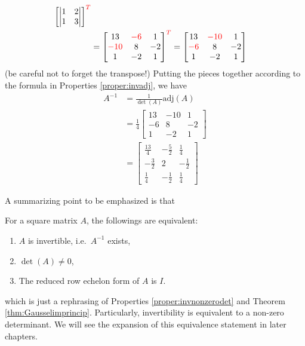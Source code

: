 \begin{solution}
\begin{align*}
\begin{bmatrix}
\begin{vmatrix}
1 & 2 \\
1 & 3 
\end{vmatrix} 
\end{bmatrix}^{\color{red}{T}} \\
&= 
\begin{bmatrix}
13 & \textcolor{red}{-6} & 1 \\
\textcolor{red}{-10} & 8 & -2 \\
1 & -2 & 1
\end{bmatrix}^{\color{red}{T}} = 
\begin{bmatrix}
13 & \textcolor{red}{-10} & 1 \\
\textcolor{red}{-6} & 8 & -2 \\
1 & -2 & 1
\end{bmatrix}
\end{align*}
(be careful not to forget the transpose!) Putting the pieces together according to the formula in Properties \ref{proper:invadj}, we have
\begin{align*}
A^{-1} &= \frac{1}{\det(A)}\text{adj}(A) \\
&= \frac{1}{4}
\begin{bmatrix}
13 & -10 & 1 \\
-6 & 8 & -2 \\
1 & -2 & 1
\end{bmatrix} \\
&= 
\begin{bmatrix}
\frac{13}{4} & -\frac{5}{2} & \frac{1}{4} \\
-\frac{3}{2} & 2 & -\frac{1}{2} \\
\frac{1}{4} & -\frac{1}{2} & \frac{1}{4}
\end{bmatrix}
\end{align*}
\end{solution}
A summarizing point to be emphasized is that
\begin{thm}
\label{thm:equiv1}
For a square matrix $A$, the followings are equivalent:
\begin{enumerate}[label=(\alph*)]
\item $A$ is invertible, i.e.\ $A^{-1}$ exists,
\item $\det(A) \neq 0$,
\item The reduced row echelon form of $A$ is $I$.
\end{enumerate}
\end{thm}
which is just a rephrasing of Properties \ref{proper:invnonzerodet} and Theorem \ref{thm:Gausselimprincip}. 
Particularly, invertibility is equivalent to a non-zero determinant. We will see the expansion of this equivalence statement in later chapters.

